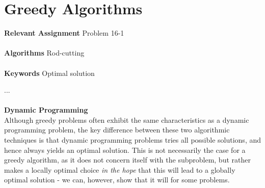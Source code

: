 
\chapter{Greedy Algorithms}
\label{ch:greedyalgorithms}

\textbf{Relevant Assignment} Problem 16-1 \\\\
\textbf{Algorithms} Rod-cutting \\\\
\textbf{Keywords} Optimal solution
\vspace{1in}

\noindent ...
\\\\
\noindent \textbf{Dynamic Programming} \\
Although greedy problems often exhibit the same characteristics as a dynamic
programming problem, the key difference between these two algorithmic
techniques is that dynamic programming problems tries all possible solutions,
and hence always yields an optimal solution. This is not necessarily the case
for a greedy algorithm, as it does not concern itself with the subproblem, but
rather makes a locally optimal choice \textit{in the hope} that this will lead
to a globally optimal solution - we can, however, show that it will for some
problems.

